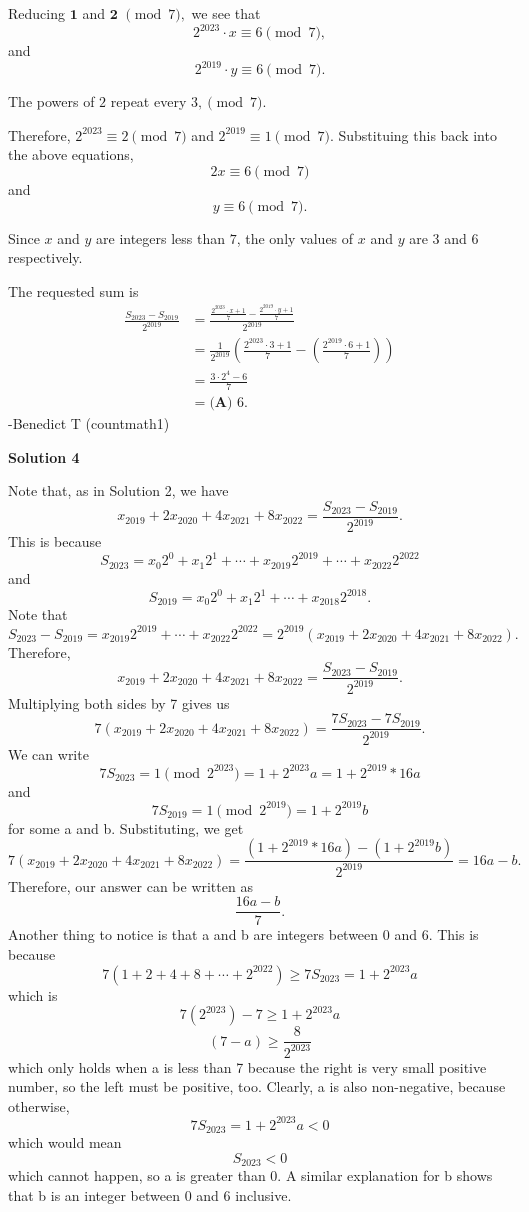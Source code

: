 \begin{enumerate}
 Reducing $\textbf{1}$ and $\textbf{2}$ $\pmod{7},$ we see that 
 \[2^{2023}\cdot{x}\equiv 6\pmod{7},\]and 
 \[2^{2019}\cdot{y}\equiv 6\pmod{7}.\]

 The powers of $2$ repeat every $3, \pmod{7}.$ 

 Therefore, $2^{2023}\equiv 2 \pmod 7$ and $2^{2019} \equiv 1 \pmod {7}.$ Substituing this back into the above equations, 
 \[2x\equiv{6}\pmod{7}\]and
 \[y\equiv{6}\pmod{7}.\]

 Since $x$ and $y$ are integers less than $7$, the only values of $x$ and $y$ are $3$ and $6$ respectively. 

 The requested sum is 
 \begin{align*} \frac{S_{2023}-S_{2019}}{2^{2019}} &= \frac{\frac{2^{2023}\cdot{x} + 1}{7} - \frac{2^{2019}\cdot{y} + 1}{7}}{2^{2019}} \\ &= \frac{1}{2^{2019}}\left(\frac{2^{2023}\cdot{3} + 1}{7} -\left(\frac{2^{2019}\cdot{6} + 1}{7}  \right)\right) \\ &= \frac{3\cdot{2^4}-6}{7} \\ &= \boxed{\textbf{(A) } 6}. \end{align*}
-Benedict T (countmath1)

 



\textbf{Solution 4}

Note that, as in Solution 2, we have 
 \[x_{2019} + 2x_{2020} + 4x_{2021} + 8x_{2022} = \frac{S_{2023} - S_{2019}}{2^{2019}}.\] This is because 
 \[S_{2023} = x_{0}2^{0} + x_{1}2^{1} + \cdots + x_{2019}2^{2019} + \cdots + x_{2022}2^{2022}\] and 
 \[S_{2019} = x_{0}2^{0} + x_{1}2^{1} + \cdots + x_{2018}2^{2018}.\] Note that 
 \[S_{2023} - S_{2019} = x_{2019}2^{2019} + \cdots + x_{2022}2^{2022} = 2^{2019}(x_{2019} + 2x_{2020} + 4x_{2021} + 8x_{2022}).\] Therefore, 
 \[x_{2019} + 2x_{2020} + 4x_{2021} + 8x_{2022} = \frac{S_{2023} - S_{2019}}{2^{2019}}.\] Multiplying both sides by 7 gives us 
 \[7(x_{2019} + 2x_{2020} + 4x_{2021} + 8x_{2022}) = \frac{7S_{2023} - 7S_{2019}}{2^{2019}}.\] We can write 
 \[7S_{2023} = 1\pmod{2^{2023}} = 1 + 2^{2023}a = 1 + 2^{2019}*16a\] and 
 \[7S_{2019} = 1\pmod{2^{2019}} = 1 + 2^{2019}b\] for some a and b. Substituting, we get 
 \[7(x_{2019} + 2x_{2020} + 4x_{2021} + 8x_{2022}) = \frac{(1 + 2^{2019} * 16a) - (1 + 2^{2019}b)}{2^{2019}} = 16a - b.\] Therefore, our answer can be written as 
 \[\frac{16a - b}{7}.\] Another thing to notice is that a and b are integers between 0 and 6. This is because 
 \[7(1 + 2 + 4 + 8 + \cdots + 2^{2022}) \geqslant 7S_{2023} = 1 + 2^{2023}a\] which is 
 \[7(2^{2023}) - 7 \geqslant 1 + 2^{2023}a\] 
 \[(7-a) \geqslant \frac{8}{2^{2023}}\] which only holds when a is less than 7 because the right is very small positive number, so the left must be positive, too. Clearly, a is also non-negative, because otherwise, 
 \[7S_{2023} = 1 + 2^{2023}a < 0\] which would mean 
 \[S_{2023} < 0\] which cannot happen, so a is greater than 0.  A similar explanation for b shows that b is an integer between 0 and 6 inclusive. 


\end{enumerate}
